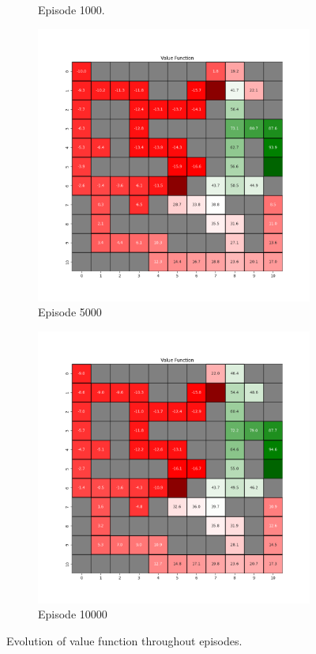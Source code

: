 \documentclass{assignment}
\begin{document}
\begin{figure}[H]
\begin{subfigure}{0.3\textwidth}
    \caption{Episode 1000.}
    \end{subfigure}\hfill
    \begin{subfigure}{0.3\textwidth}
        \includegraphics[width=\textwidth]{figures/value_q/epsilon_sweep/value_function_alpha_0.1_gamma_0.95_epsilon_1.0_iteration_5000.png}
    \caption{Episode 5000}
    \end{subfigure}\hfill
    \begin{subfigure}{0.3\textwidth}
        \includegraphics[width=\textwidth]{figures/value_q/epsilon_sweep/value_function_alpha_0.1_gamma_0.95_epsilon_1.0_iteration_10000.png}
    \caption{Episode 10000}
    \end{subfigure}
    \caption{Evolution of value function throughout episodes.}
    \label{fig:epsilon_1.0_q_learning_value}
\end{figure}
\end{document}
